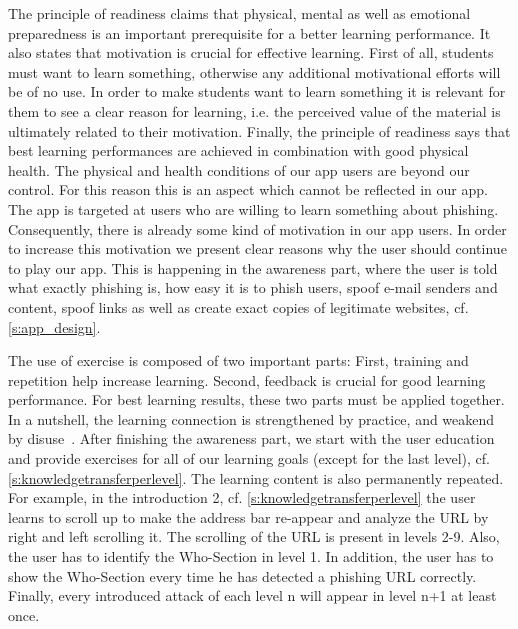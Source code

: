 \begin{description}[leftmargin=0cm]
	\item[Readiness:] The principle of readiness claims that physical, mental as well as emotional preparedness is an important prerequisite for a better learning performance. 
It also states that motivation is crucial for effective learning. 
First of all, students must want to learn something, otherwise any additional motivational efforts will be of no use. 
In order to make students want to learn something it is relevant for them to see a clear reason for learning, i.e. the perceived value of the material is ultimately related to their motivation. 
Finally, the principle of readiness says that best learning performances are achieved in combination with good physical health.
The physical and health conditions of our app users are beyond our control.
For this reason this is an aspect which cannot be reflected in our app.
The app is targeted at users who are willing to learn something about phishing. 
Consequently, there is already some kind of motivation in our app users.
In order to increase this motivation we present clear reasons why the user should continue to play our app.
This is happening in the awareness part, where the user is told what exactly phishing is, how easy it is to phish users, spoof e-mail senders and content, spoof links as well as create exact copies of legitimate websites, cf. \autoref{s:app_design}.
	\item[Exercise:] The use of exercise is composed of two important parts: 
First, training and repetition help increase learning. 
Second, feedback is crucial for good learning performance.
For best learning results, these two parts must be applied together.
In a nutshell, the learning connection is strengthened by practice, and weakend by disuse~\cite{handbook2008us}.
After finishing the awareness part, we start with the user education and provide exercises for all of our learning goals (except for the last level), cf. \autoref{s:knowledgetransferperlevel}.
The learning content is also permanently repeated. 
For example, in the introduction 2, cf. \autoref{s:knowledgetransferperlevel} the user learns to scroll up to make the address bar re-appear and analyze the URL by right and left scrolling it. 
The scrolling of the URL is present in levels 2-9.
Also, the user has to identify the Who-Section in level 1. 
In addition, the user has to show the Who-Section every time he has detected a phishing URL correctly.
Finally, every introduced attack of each level n will appear in level n+1 at least once. 

\end{description}
